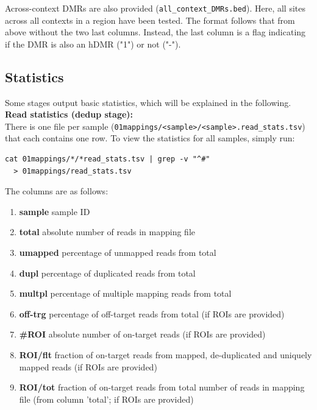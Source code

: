 \documentclass{article}
\begin{document}
Across-context DMRs are also provided (\verb|all_context_DMRs.bed|). Here, all sites across all contexts in a region have been tested. The format follows that from above without the two last columns. Instead, the last column is a flag indicating if the DMR is also an hDMR ("1") or not ("-").

\subsection*{Statistics}
\label{stats}

Some stages output basic statistics, which will be explained in the following.\\

\noindent \textbf{Read statistics (dedup stage):}\\
\noindent There is one file per sample (\verb|01mappings/<sample>/<sample>.read_stats.tsv|) that each contains one row. To view the statistics for all samples, simply run:
\begin{lstlisting}
cat 01mappings/*/*read_stats.tsv | grep -v "^#" 
  > 01mappings/read_stats.tsv
\end{lstlisting}
The columns are as follows:
\begin{enumerate}
	\item \textbf{sample} sample ID
	\item \textbf{total} absolute number of reads in mapping file
	\item \textbf{umapped} percentage of unmapped reads from total
	\item \textbf{dupl} percentage of duplicated reads from total
	\item \textbf{multpl} percentage of multiple mapping reads from total
	\item \textbf{off-trg} percentage of off-target reads from total (if ROIs are provided)
	\item \textbf{\#ROI} absolute number of on-target reads (if ROIs are provided)
	\item \textbf{ROI/flt} fraction of on-target reads from mapped, de-duplicated and uniquely mapped reads (if ROIs are provided)
	\item \textbf{ROI/tot}	fraction of on-target reads from total number of reads in mapping file (from column 'total'; if ROIs are provided)
\end{enumerate}	
\end{document}
